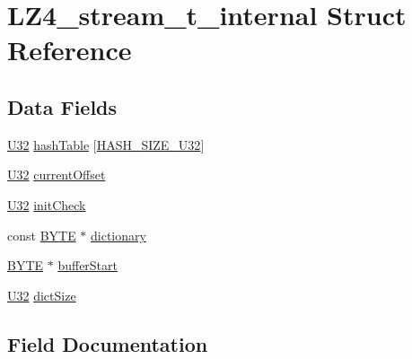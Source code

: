 \hypertarget{struct_l_z4__stream__t__internal}{}\section{L\+Z4\+\_\+stream\+\_\+t\+\_\+internal Struct Reference}
\label{struct_l_z4__stream__t__internal}
\subsection*{Data Fields}
\begin{DoxyCompactItemize}
\item 
\mbox{\hyperlink{lz4_8c_ac3df7cf3c8cb172a588adec881447d68}{U32}} \mbox{\hyperlink{struct_l_z4__stream__t__internal_a81762be862caad87455554f2d39d4a29}{hash\+Table}} \mbox{[}\mbox{\hyperlink{lz4_8c_a10355a0f2e4e7f206a362ffa2272ec22}{H\+A\+S\+H\+\_\+\+S\+I\+Z\+E\+\_\+\+U32}}\mbox{]}
\item 
\mbox{\hyperlink{lz4_8c_ac3df7cf3c8cb172a588adec881447d68}{U32}} \mbox{\hyperlink{struct_l_z4__stream__t__internal_a2cdbcab32d03f345fd3c37af43c45523}{current\+Offset}}
\item 
\mbox{\hyperlink{lz4_8c_ac3df7cf3c8cb172a588adec881447d68}{U32}} \mbox{\hyperlink{struct_l_z4__stream__t__internal_a210c641599a4633cbf4e590cbc7a0a58}{init\+Check}}
\item 
const \mbox{\hyperlink{lz4_8c_a4ae1dab0fb4b072a66584546209e7d58}{B\+Y\+TE}} $\ast$ \mbox{\hyperlink{struct_l_z4__stream__t__internal_aea78f571ae3100b95df66b1d39c48aee}{dictionary}}
\item 
\mbox{\hyperlink{lz4_8c_a4ae1dab0fb4b072a66584546209e7d58}{B\+Y\+TE}} $\ast$ \mbox{\hyperlink{struct_l_z4__stream__t__internal_ae97c8d0df5e183aaba780e69655f923e}{buffer\+Start}}
\item 
\mbox{\hyperlink{lz4_8c_ac3df7cf3c8cb172a588adec881447d68}{U32}} \mbox{\hyperlink{struct_l_z4__stream__t__internal_a39e9e581f2a3c904bb1a912fd1611e72}{dict\+Size}}
\end{DoxyCompactItemize}


\subsection{Field Documentation}
\mbox{\label{struct_l_z4__stream__t__internal_ae97c8d0df5e183aaba780e69655f923e}} 
